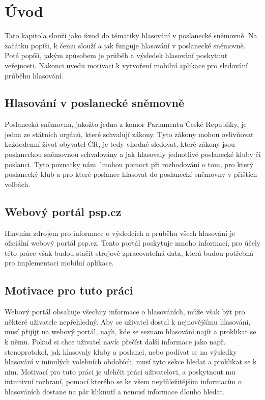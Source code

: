 \chapter{Úvod}

\setcounter{page}{1}

\begin{chapterabstract}
	Tato kapitola slouží jako úvod do tématiky hlasování v poslanecké sněmovně. Na začátku popíši, k čemu slouží a jak funguje hlasování v poslanecké sněmovně. Poté popíši, jakým způsobem je průběh a výsledek hlasování poskytnut veřejnosti. Nakonci uvedu motivaci k vytvoření mobilní aplikace pro sledování průběhu hlasování.
\end{chapterabstract}


\section{Hlasování v poslanecké sněmovně}
Poslanecká sněmovna, jakožto jedna z komor Parlamentu České Republiky, je jedna ze státních orgánů, které schvalují zákony. Tyto zákony mohou ovlivňovat každodenní život obyvatel ČR, je tedy vhodné sledovat, které zákony jsou poslaneckou sněmovnou schvalovány a jak hlasovaly jednotlivé poslanecké kluby či poslanci. Tyto poznatky nám ´mohou pomoct při rozhodování o tom, pro který poslanecký klub a pro které poslance hlasovat do poslanecké sněmovny v příštích volbách.

\section{Webový portál psp.cz}
Hlavním zdrojem pro informace o výsledcích a průběhu všech hlasování je oficiální webový portál psp.cz. Tento portál poskytuje mnoho informací, pro účely této práce však budou stačit strojově zpracovatelná data, která budou potřebná pro implementaci mobilní aplikace.

\section{Motivace pro tuto práci}
Webový portál obsahuje všechny informace o hlasováních, může však být pro některé uživatele nepřehledný. Aby se uživatel dostal k nejnovějšímu hlasování, musí přijíjt na webový portál, najít, kde se seznam hlasování najít a proklikat se k němu. Pokud si chce uživatel navíc přečíst další informace jako např. stenoprotokol, jak hlasovaly kluby a poslanci, nebo podívat se na výsledky hlasování v minulých volebních obdobích, musí tyto sekce hledat a proklikat se k nim. Motivací pro tuto práci je ulehčit práci uživatelovi, a poskytnout mu intuitivní rozhraní, pomocí kterého se ke všem nejdůležitějším informacím o hlasováních dostane na pár kliknutí a nemusí informace dlouho hledat.